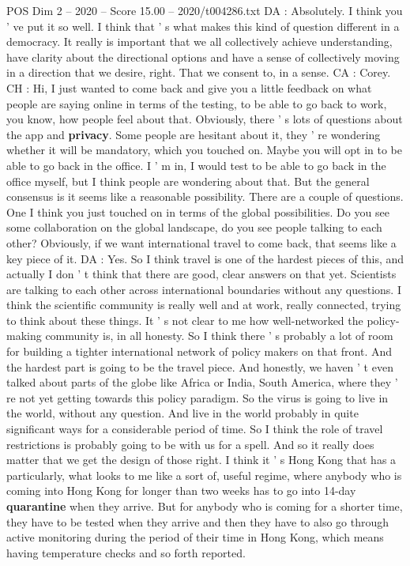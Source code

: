 \begin{textsample}{POS Dim 2 – 2020 – Score 15.00 – 2020/t004286.txt}
DA : Absolutely.
I think you ' ve put it so well.
I think that ' s what makes this kind of question different in a democracy.
It really is important that we all collectively achieve understanding, have clarity about the directional options and have a sense of collectively moving in a direction that we desire, right.
That we consent to, in a sense.
CA : Corey.
CH : Hi, I just wanted to come back and give you a little feedback on what people are saying online in terms of the testing, to be able to go back to work, you know, how people feel about that.
Obviously, there ' s lots of questions about the app and \textbf{privacy}.
Some people are hesitant about it, they ' re wondering whether it will be mandatory, which you touched on.
Maybe you will opt in to be able to go back in the office.
I ' m in, I would test to be able to go back in the office myself, but I think people are wondering about that.
But the general consensus is it seems like a reasonable possibility.
There are a couple of questions.
One I think you just touched on in terms of the global possibilities.
Do you see some collaboration on the global landscape, do you see people talking to each other?
Obviously, if we want international travel to come back, that seems like a key piece of it.
DA : Yes.
So I think travel is one of the hardest pieces of this, and actually I don ' t think that there are good, clear answers on that yet.
Scientists are talking to each other across international boundaries without any questions.
I think the scientific community is really well and at work, really connected, trying to think about these things.
It ' s not clear to me how well-networked the policy-making community is, in all honesty.
So I think there ' s probably a lot of room for building a tighter international network of policy makers on that front.
And the hardest part is going to be the travel piece.
And honestly, we haven ' t even talked about parts of the globe like Africa or India, South America, where they ' re not yet getting towards this policy paradigm.
So the virus is going to live in the world, without any question.
And live in the world probably in quite significant ways for a considerable period of time.
So I think the role of travel restrictions is probably going to be with us for a spell.
And so it really does matter that we get the design of those right.
I think it ' s Hong Kong that has a particularly, what looks to me like a sort of, useful regime, where anybody who is coming into Hong Kong for longer than two weeks has to go into 14-day \textbf{quarantine} when they arrive.
But for anybody who is coming for a shorter time, they have to be tested when they arrive and then they have to also go through active monitoring during the period of their time in Hong Kong, which means having temperature checks and so forth reported.

\end{textsample}
